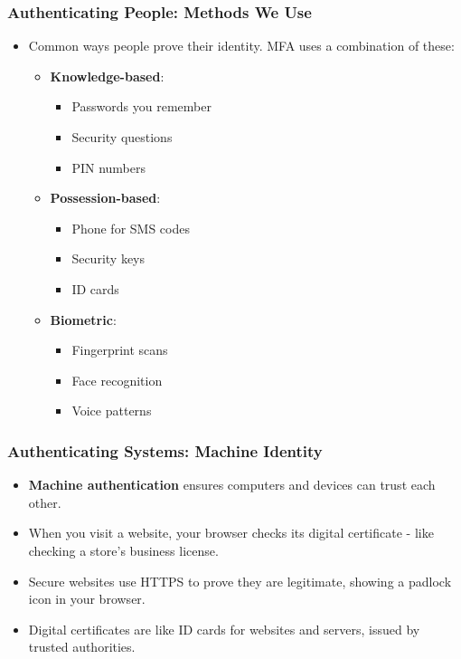 \documentclass{beamer}
\begin{document}
\begin{frame}
    \frametitle{Authenticating People: Methods We Use}
    \begin{itemize}
        \item Common ways people prove their identity. MFA uses a combination of these:
            \begin{itemize}
                \item \textbf{Knowledge-based}: 
                    \begin{itemize}
                        \item Passwords you remember
                        \item Security questions
                        \item PIN numbers
                    \end{itemize}
                \item \textbf{Possession-based}:
                    \begin{itemize}
                        \item Phone for SMS codes
                        \item Security keys
                        \item ID cards
                    \end{itemize}
                \item \textbf{Biometric}:
                    \begin{itemize}
                        \item Fingerprint scans
                        \item Face recognition
                        \item Voice patterns
                    \end{itemize}
            \end{itemize}
    \end{itemize}
\end{frame}

\begin{frame}
    \frametitle{Authenticating Systems: Machine Identity}
    \begin{itemize}
        \item \textbf{Machine authentication} ensures computers and devices can trust each other.
        \item When you visit a website, your browser checks its digital certificate - like checking a store's business license.
        \item Secure websites use HTTPS to prove they are legitimate, showing a padlock icon in your browser.
        \item Digital certificates are like ID cards for websites and servers, issued by trusted authorities.
    \end{itemize}
\end{frame}
\end{document}
